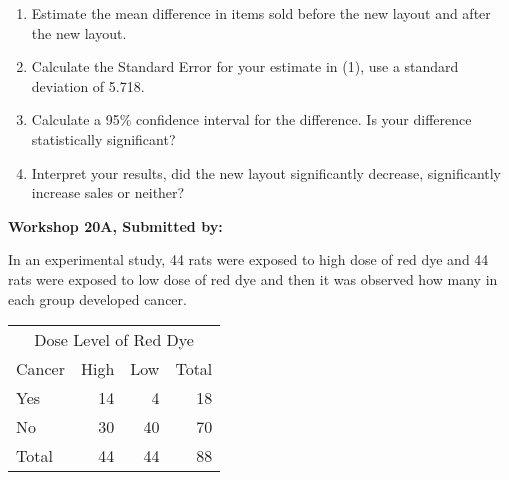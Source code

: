 \documentclass[11pt]{book}\usepackage[]{graphicx}\usepackage[]{color}
\begin{document}
\begin{exercises}
\begin{exercise}
\begin{enumerate}
  \item Estimate the mean difference in items sold before the new layout and after the new layout.
  \item	Calculate the Standard Error for your estimate in (1), use a standard deviation of 5.718.
  \item	Calculate a 95\% confidence interval for the difference. Is your difference statistically significant?
  \item	Interpret your results, did the new layout significantly decrease, significantly increase sales or neither?
\end{enumerate}

\end{exercise}
\begin{solution}  %

\end{solution}


\clearpage

    \begin{exercise}  %

    \begin{center}
\begin{flushleft}\textbf{\large \hfill Workshop 20A, Submitted by: }\end{flushleft}

\end{center}

In an experimental study, 44 rats were exposed to high dose of red dye and 44 rats were exposed to low dose of red dye and then it was observed how many in each group developed cancer.

\begin{table}[ht]
\centering
\begin{tabular}{@{} l rrr @{}} \hline
  \multicolumn{4}{c}{Dose Level of Red Dye} \\
Cancer&	High&	Low&	Total \\ \hline
Yes &	14 &	4 &	18 \\
No &	30 &	40 &	70 \\ \hline
Total &	44 &	44 &	88 \\ \hline
\end{tabular}
\end{table}


\end{exercise}
\end{exercises}
\end{document}
